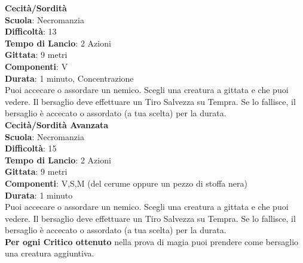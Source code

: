 \begin{multicols}{2}
\medskip\textbf{Cecità/Sordità}\\
\textbf{Scuola}: Necromanzia\\
\textbf{Difficoltà}:  13\\
\textbf{Tempo di Lancio}: 2 Azioni\\
\textbf{Gittata}: 9 metri\\
\textbf{Componenti}: V\\
\textbf{Durata}: 1 minuto, Concentrazione\\
Puoi accecare o assordare un nemico. Scegli una creatura a gittata e che puoi vedere. Il bersaglio deve effettuare un Tiro Salvezza su Tempra. Se lo fallisce, il bersaglio è accecato o assordato (a tua scelta) per la durata.\\

\medskip\textbf{Cecità/Sordità Avanzata}\\
\textbf{Scuola}: Necromanzia\\
\textbf{Difficoltà}:  15\\
\textbf{Tempo di Lancio}: 2 Azioni\\
\textbf{Gittata}: 9 metri\\
\textbf{Componenti}: V,S,M (del cerume oppure un pezzo di stoffa nera)\\
\textbf{Durata}: 1 minuto\\
Puoi accecare o assordare un nemico. Scegli una creatura a gittata e che puoi vedere. Il bersaglio deve effettuare un Tiro Salvezza su Tempra. Se lo fallisce, il bersaglio è accecato o assordato (a tua scelta) per la durata.\\
\textbf{Per ogni Critico ottenuto} nella prova di magia puoi prendere come bersaglio una creatura aggiuntiva.


\end{multicols}
